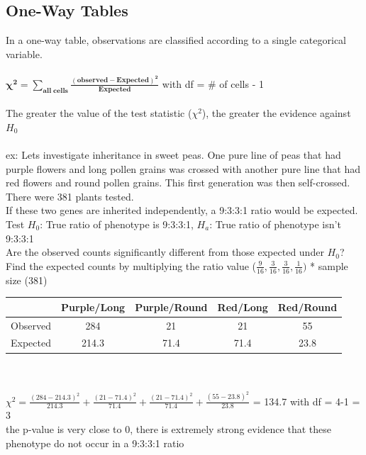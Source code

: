 \documentclass[12pt, a4paper]{article}
\begin{document}
	\subsection{One-Way Tables}
	In a one-way table, observations are classified according to a single categorical variable. \\~\\
	$\bm{\chi^2 = \sum_{all\;cells} \frac{(observed - Expected)^2}{Expected}}$ with df = \# of cells - 1\\~\\
	The greater the value of the test statistic ($\chi^2$), the greater the evidence against $H_0$ \\~\\
	ex: Lets investigate inheritance in sweet peas. One pure line of peas that had purple flowers and long pollen grains was crossed with another pure line that had red flowers and round pollen grains. This  first generation was then self-crossed. There were 381 plants tested. \\ If these two genes are inherited independently, a 9:3:3:1 ratio would be expected. \\ Test $H_0$: True ratio of phenotype is 9:3:3:1, $H_a$: True ratio of phenotype isn't 9:3:3:1 \\ Are the observed counts significantly different from those expected under $H_0$? \\
	Find the expected counts by multiplying the ratio value ($\frac{9}{16},\frac{3}{16},\frac{3}{16},\frac{1}{16})$ * sample size (381)\\
	\begin{tabular}{ |c|c|c|c|c| }
		\hline
		 & Purple/Long & Purple/Round & Red/Long & Red/Round \\ \hline
		Observed & 284 & 21 & 21 & 55 \\
		Expected & 214.3 & 71.4 & 71.4 & 23.8 \\
		\hline
	\end{tabular} \\~\\
	$\chi^2 = \frac{(284-214.3)^2}{214.3} + \frac{(21-71.4)^2}{71.4} + \frac{(21-71.4)^2}{71.4} + \frac{(55-23.8)^2}{23.8}$ = 134.7 with df = 4-1 = 3 \\ the p-value is very close to 0, there is extremely strong evidence that these phenotype do not occur in a 9:3:3:1 ratio \\~\\
	
\end{document}
